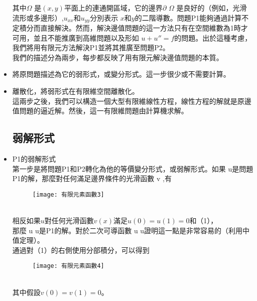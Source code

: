 \begin{itemize}
\qquad 其中$\Omega$ 是$ (x,y)$平面上的連通開區域，它的邊界$ \partial $ $\Omega$ 是良好的（例如，光滑流形或多邊形）,$ u_{{xx}}$和$ u_{{yy}}$分別表示 $ x$和$ y$的二階導數。問題P1能夠通過計算不定積分而直接解決。然而，解決邊值問題的這一方法只有在空間維數為1時才可用，並且不能推廣到高維問題以及形如 $u+u''=f$的問題。出於這種考慮，我們將用有限元方法解決P1並將其推廣至問題P2。\\ 
\qquad 我們的描述分為兩步，每步都反映了用有限元解決邊值問題的本質。 \\
\item 將原問題描述為它的弱形式，或變分形式。這一步很少或不需要計算。\\
\item 離散化，將弱形式在有限維空間離散化。\\

\qquad 這兩步之後，我們可以構造一個大型有限維線性方程，線性方程的解就是原邊值問題的逼近解。然後，這一有限維問題由計算機求解。 \\

\subsection{弱解形式}
\item P1的弱解形式\\

\qquad 第一步是將問題P1和P2轉化為他的等價變分形式，或弱解形式。如果 u是問題P1的解，那麼對任何滿足邊界條件的光滑函數 v ,有 \\
\begin{figure}[hbt!]
\begin{center}
\texttt{[image: 有限元素函數3]}
\end{center}
\end{figure}
\\

\qquad 相反如果$ u$對任何光滑函數$ v(x)$滿足$ u(0)=u(1)=0$和（1），\\

\qquad 那麼 u u是P1的解。對於二次可導函數 u u證明這一點是非常容易的（利用中值定理）。\\

\qquad 通過對（1）的右側使用分部積分，可以得到 \\
\begin{figure}[hbt!]
\begin{center}
\texttt{[image: 有限元素函數4]}
\end{center}
\end{figure}
\\
其中假設$ v(0)=v(1)=0$。\\


\end{itemize}
